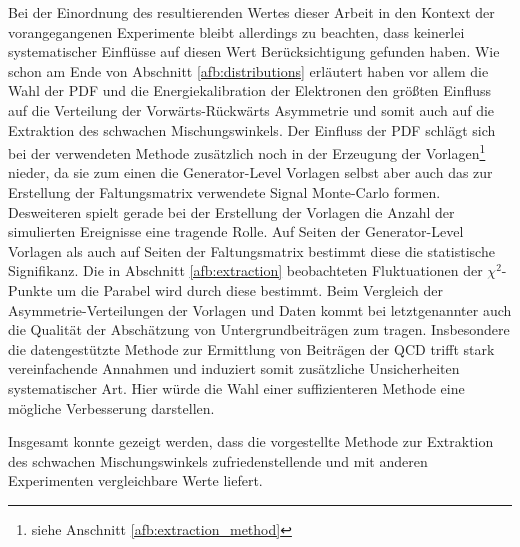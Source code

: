 Bei der Einordnung des resultierenden Wertes dieser Arbeit in den Kontext der
vorangegangenen Experimente bleibt allerdings zu beachten, dass keinerlei
systematischer Einflüsse auf diesen Wert Berücksichtigung gefunden haben. Wie
schon am Ende von Abschnitt \ref{afb:distributions} erläutert haben vor allem
die Wahl der \ac{PDF} und die Energiekalibration der Elektronen den größten
Einfluss auf die Verteilung der Vorwärts-Rückwärts Asymmetrie und somit auch
auf die Extraktion des schwachen Mischungswinkels. Der Einfluss der \ac{PDF}
schlägt sich bei der verwendeten Methode zusätzlich noch in der Erzeugung der
Vorlagen\footnote{siehe Anschnitt \ref{afb:extraction_method}} nieder, da sie
zum einen die Generator-Level Vorlagen selbst aber auch das zur Erstellung der
Faltungsmatrix verwendete Signal Monte-Carlo formen. Desweiteren spielt gerade
bei der Erstellung der Vorlagen die Anzahl der simulierten Ereignisse eine
tragende Rolle. Auf Seiten der Generator-Level Vorlagen als auch auf Seiten der
Faltungsmatrix bestimmt diese die statistische Signifikanz. Die in Abschnitt
\ref{afb:extraction} beobachteten Fluktuationen der $\chi^2$-Punkte um die
Parabel wird durch diese bestimmt. Beim Vergleich der Asymmetrie-Verteilungen
der Vorlagen und Daten kommt bei letztgenannter auch die Qualität der
Abschätzung von Untergrundbeiträgen zum tragen. Insbesondere die datengestützte
Methode zur Ermittlung von Beiträgen der \ac{QCD} trifft stark vereinfachende
Annahmen und induziert somit zusätzliche Unsicherheiten systematischer Art.
Hier würde die Wahl einer suffizienteren Methode eine mögliche Verbesserung
darstellen.

Insgesamt konnte gezeigt werden, dass die vorgestellte Methode zur Extraktion
des schwachen Mischungswinkels zufriedenstellende und mit anderen Experimenten
vergleichbare Werte liefert.

